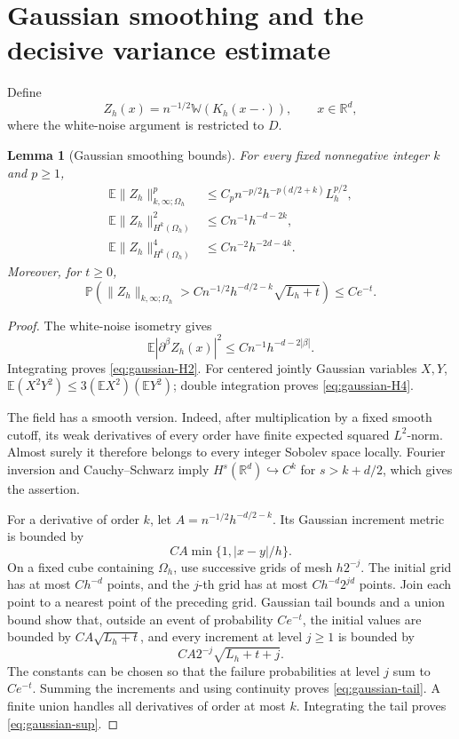 \documentclass[11pt]{article}
\newtheorem{lemma}[theorem]{Lemma}
\theoremstyle{remark}
\newcommand{\R}{\mathbb R}
\newcommand{\E}{\mathbb E}
\newcommand{\Prob}{\mathbb P}
\begin{document}
\section{Gaussian smoothing and the decisive variance estimate}

Define
\[
Z_h(x)=n^{-1/2}\mathbb W(K_h(x-\cdot)),\qquad x\in\R^d,
\]
where the white-noise argument is restricted to \(D\).

\begin{lemma}[Gaussian smoothing bounds]\label{lem:gaussian}
For every fixed nonnegative integer \(k\) and \(p\geq1\),
\begin{align}
\E\|Z_h\|_{k,\infty;\Omega_h}^{p}
&\leq C_p n^{-p/2}h^{-p(d/2+k)}L_h^{p/2},
\label{eq:gaussian-sup}\\
\E\|Z_h\|_{H^k(\Omega_h)}^2
&\leq Cn^{-1}h^{-d-2k},\label{eq:gaussian-H2}\\
\E\|Z_h\|_{H^k(\Omega_h)}^4
&\leq Cn^{-2}h^{-2d-4k}.
\label{eq:gaussian-H4}
\end{align}
Moreover, for \(t\geq0\),
\begin{equation}\label{eq:gaussian-tail}
\Prob\left(
\|Z_h\|_{k,\infty;\Omega_h}>
C n^{-1/2}h^{-d/2-k}\sqrt{L_h+t}
\right)\leq Ce^{-t}.
\end{equation}
\end{lemma}

\begin{proof}
The white-noise isometry gives
\[
\E|\partial^\beta Z_h(x)|^2
\leq Cn^{-1}h^{-d-2|\beta|}.
\]
Integrating proves \eqref{eq:gaussian-H2}.
For centered jointly Gaussian variables \(X,Y\),
\(\E(X^2Y^2)\leq3(\E X^2)(\E Y^2)\);
double integration proves \eqref{eq:gaussian-H4}.

The field has a smooth version. Indeed, after multiplication by a
fixed smooth cutoff, its weak derivatives of every order have finite
expected squared \(L^2\)-norm. Almost surely it therefore belongs to
every integer Sobolev space locally. Fourier inversion and
Cauchy--Schwarz imply \(H^s(\R^d)\hookrightarrow C^k\) for
\(s>k+d/2\), which gives the assertion.

For a derivative of order \(k\), let
\(A=n^{-1/2}h^{-d/2-k}\).
Its Gaussian increment metric is bounded by
\[
CA\min\{1,|x-y|/h\}.
\]
On a fixed cube containing \(\Omega_h\), use successive grids of mesh
\(h2^{-j}\). The initial grid has at most \(Ch^{-d}\) points, and
the \(j\)-th grid has at most \(Ch^{-d}2^{jd}\) points.
Join each point to a nearest point of the preceding grid.
Gaussian tail bounds and a union bound show that, outside an event
of probability \(Ce^{-t}\), the initial values are bounded by
\(CA\sqrt{L_h+t}\), and every increment at level \(j\geq1\) is bounded by
\[
CA2^{-j}\sqrt{L_h+t+j}.
\]
The constants can be chosen so that the failure probabilities at
level \(j\) sum to \(Ce^{-t}\).
Summing the increments and using continuity proves
\eqref{eq:gaussian-tail}. A finite union handles all derivatives
of order at most \(k\). Integrating the tail proves
\eqref{eq:gaussian-sup}.
\end{proof}
\end{document}
